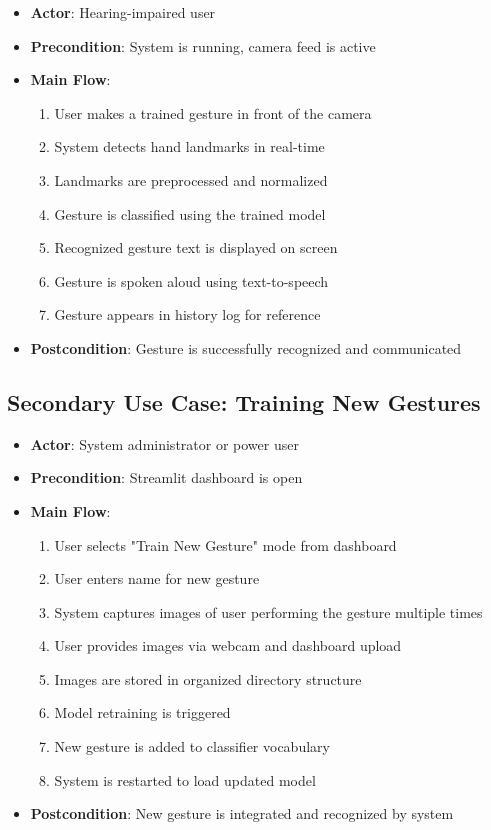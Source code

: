 \begin{itemize}
    \item \textbf{Actor}: Hearing-impaired user
    \item \textbf{Precondition}: System is running, camera feed is active
    \item \textbf{Main Flow}:
    \begin{enumerate}
        \item User makes a trained gesture in front of the camera
        \item System detects hand landmarks in real-time
        \item Landmarks are preprocessed and normalized
        \item Gesture is classified using the trained model
        \item Recognized gesture text is displayed on screen
        \item Gesture is spoken aloud using text-to-speech
        \item Gesture appears in history log for reference
    \end{enumerate}
    \item \textbf{Postcondition}: Gesture is successfully recognized and communicated
\end{itemize}

\subsection{Secondary Use Case: Training New Gestures}

\begin{itemize}
    \item \textbf{Actor}: System administrator or power user
    \item \textbf{Precondition}: Streamlit dashboard is open
    \item \textbf{Main Flow}:
    \begin{enumerate}
        \item User selects "Train New Gesture" mode from dashboard
        \item User enters name for new gesture
        \item System captures images of user performing the gesture multiple times
        \item User provides images via webcam and dashboard upload
        \item Images are stored in organized directory structure
        \item Model retraining is triggered
        \item New gesture is added to classifier vocabulary
        \item System is restarted to load updated model
    \end{enumerate}
    \item \textbf{Postcondition}: New gesture is integrated and recognized by system
\end{itemize}

